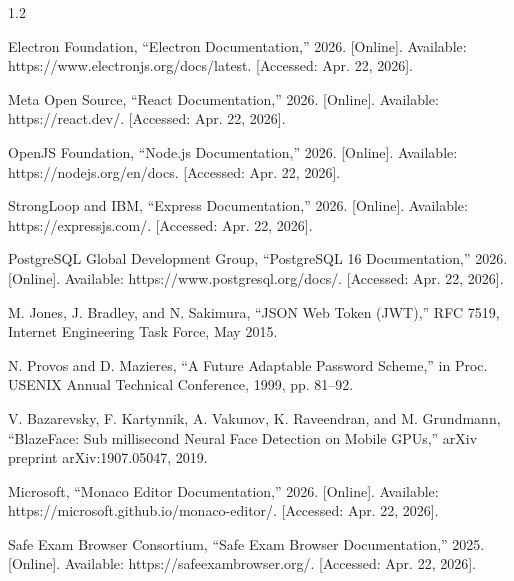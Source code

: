 \documentclass[12pt, a4paper]{report}
\newcommand{\blanklines}[1]{\vspace{#1\dimexpr 18pt\relax}}
\begin{document}
\blanklines{2}

\begin{spacing}{1.2}
  \setlength{\parskip}{6pt}
  \begin{list}{}{
    \setlength{\leftmargin}{0.31in}
    \setlength{\itemindent}{-0.31in}
    \setlength{\topsep}{0pt}
    \setlength{\itemsep}{6pt}
    \setlength{\parsep}{0pt}
  }
    \fontsize{12}{14}\selectfont

    \item[1.] Electron Foundation, ``Electron Documentation,'' 2026. [Online]. Available: https://www.electronjs.org/docs/latest. [Accessed: Apr. 22, 2026].

    \item[2.] Meta Open Source, ``React Documentation,'' 2026. [Online]. Available: https://react.dev/. [Accessed: Apr. 22, 2026].

    \item[3.] OpenJS Foundation, ``Node.js Documentation,'' 2026. [Online]. Available: https://nodejs.org/en/docs. [Accessed: Apr. 22, 2026].

    \item[4.] StrongLoop and IBM, ``Express Documentation,'' 2026. [Online]. Available: https://expressjs.com/. [Accessed: Apr. 22, 2026].

    \item[5.] PostgreSQL Global Development Group, ``PostgreSQL 16 Documentation,'' 2026. [Online]. Available: https://www.postgresql.org/docs/. [Accessed: Apr. 22, 2026].

    \item[6.] M. Jones, J. Bradley, and N. Sakimura, ``JSON Web Token (JWT),'' RFC 7519, Internet Engineering Task Force, May 2015.

    \item[7.] N. Provos and D. Mazieres, ``A Future Adaptable Password Scheme,'' in Proc. USENIX Annual Technical Conference, 1999, pp. 81--92.

    \item[8.] V. Bazarevsky, F. Kartynnik, A. Vakunov, K. Raveendran, and M. Grundmann, ``BlazeFace: Sub millisecond Neural Face Detection on Mobile GPUs,'' arXiv preprint arXiv:1907.05047, 2019.

    \item[9.] Microsoft, ``Monaco Editor Documentation,'' 2026. [Online]. Available: https://microsoft.github.io/monaco-editor/. [Accessed: Apr. 22, 2026].

    \item[10.] Safe Exam Browser Consortium, ``Safe Exam Browser Documentation,'' 2025. [Online]. Available: https://safeexambrowser.org/. [Accessed: Apr. 22, 2026].


\end{list}
\end{spacing}
\end{document}
